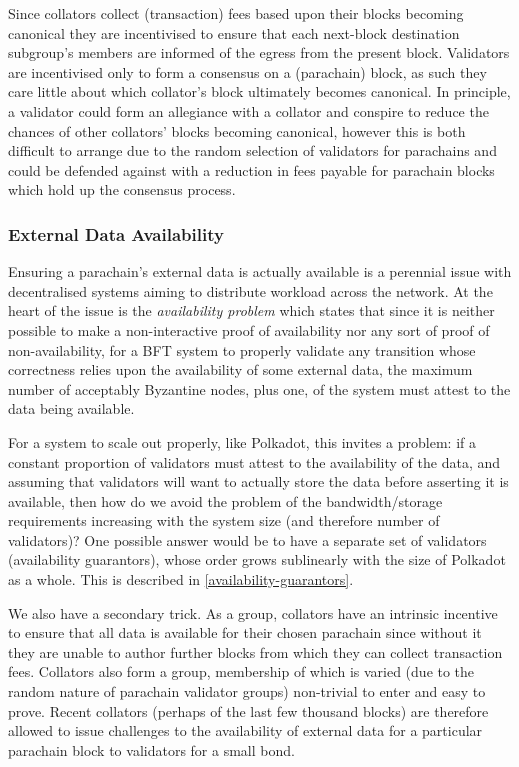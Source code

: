 \documentclass[9pt,oneside]{amsart}
\begin{document}
\begin{multicols}{2}
 Since collators collect (transaction) fees based upon their blocks becoming canonical they are incentivised to ensure that each next-block destination subgroup's members are informed of the egress from the present block. Validators are incentivised only to form a consensus on a (parachain) block, as such they care little about which collator's block ultimately becomes canonical. In principle, a validator could form an allegiance with a collator and conspire to reduce the chances of other collators' blocks becoming canonical, however this is both difficult to arrange due to the random selection of validators for parachains and could be defended against with a reduction in fees payable for parachain blocks which hold up the consensus process.

\subsubsection{External Data Availability}

 Ensuring a parachain's external data is actually available is a perennial issue with decentralised systems aiming to distribute workload across the network. At the heart of the issue is the \textit{availability problem} which states that since it is neither possible to make a non-interactive proof of availability nor any sort of proof of non-availability, for a BFT system to properly validate any transition whose correctness relies upon the availability of some external data, the maximum number of acceptably Byzantine nodes, plus one, of the system must attest to the data being available.

 For a system to scale out properly, like Polkadot, this invites a problem: if a constant proportion of validators must attest to the availability of the data, and assuming that validators will want to actually store the data before asserting it is available, then how do we avoid the problem of the bandwidth/storage requirements increasing with the system size (and therefore number of validators)? One possible answer would be to have a separate set of validators (availability guarantors), whose order grows sublinearly with the size of Polkadot as a whole. This is described in \ref{availability-guarantors}.

 We also have a secondary trick. As a group, collators have an intrinsic incentive to ensure that all data is available for their chosen parachain since without it they are unable to author further blocks from which they can collect transaction fees. Collators also form a group, membership of which is varied (due to the random nature of parachain validator groups) non-trivial to enter and easy to prove. Recent collators (perhaps of the last few thousand blocks) are therefore allowed to issue challenges to the availability of external data for a particular parachain block to validators for a small bond.


\end{multicols}
\end{document}
